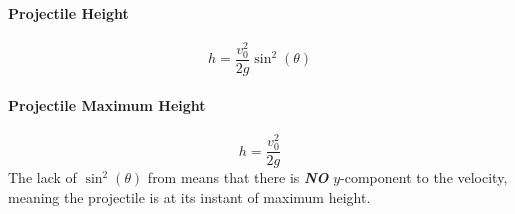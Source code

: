\paragraph{Projectile Height}\label{par:Projectile Height}
\begin{equation}\label{eq:Projectile Height}
  h = \frac{v_{0}^{2}}{2g} \sin^{2} ( \theta )
\end{equation}

\paragraph{Projectile Maximum Height}\label{par:Projectile Maximum Height}
\begin{equation}
  h = \frac{v_{0}^{2}}{2g}
\end{equation}
The lack of $\sin^{2} ( \theta )$ from  means that there is \textbf{\emph{NO}} $y$-component to the velocity, meaning the projectile is at its instant of maximum height.

